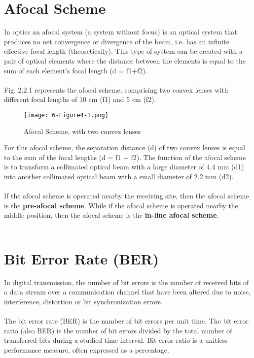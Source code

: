 \documentclass[hidelinks, 12pt]{report}
\begin{document}
\section{Afocal Scheme}
\justify
In optics an afocal system (a system without focus) is an optical system that produces no net convergence or divergence of the beam, i.e. has an infinite effective focal length (theoretically). This type of system can be created with a pair of optical elements where the distance between the elements is equal to the sum of each element's focal length (d = f1+f2). \\
\\
Fig. 2.2.1 represents the afocal scheme, comprising two convex lenses with different focal lengths
of 10 cm (f1) and 5 cm (f2). 
\begin{figure}[H]
\centering
\texttt{[image: 6-Figure4-1.png]}
\caption[Afocal Scheme, with two convex lenses]{Afocal Scheme, with two convex lenses}
\label{Afocal Scheme, with two convex lenses}
\end{figure}

For this afocal scheme, the separation distance (d) of two convex
lenses is equal to the sum of the focal lengths (d = f1 + f2). The function of the afocal scheme
is to transform a collimated optical beam with a large diameter of 4.4 mm (d1) into another collimated
optical beam with a small diameter of 2.2 mm (d2).\\
\\
 If the afocal scheme is operated nearby the receiving site, then the afocal
scheme is the \textbf{pre-afocal scheme}. While if the afocal scheme is operated nearby the middle position,
then the afocal scheme is the \textbf{in-line afocal scheme}.\\
\\
\section{Bit Error Rate (BER)}
\justify
In digital transmission, the number of bit errors is the number of received bits of a data stream over a communication channel that have been altered due to noise, interference, distortion or bit synchronization errors.\\

\\The bit error rate (BER) is the number of bit errors per unit time. The bit error ratio (also BER) is the number of bit errors divided by the total number of transferred bits during a studied time interval. Bit error ratio is a unitless performance measure, often expressed as a percentage.\\
\end{document}
